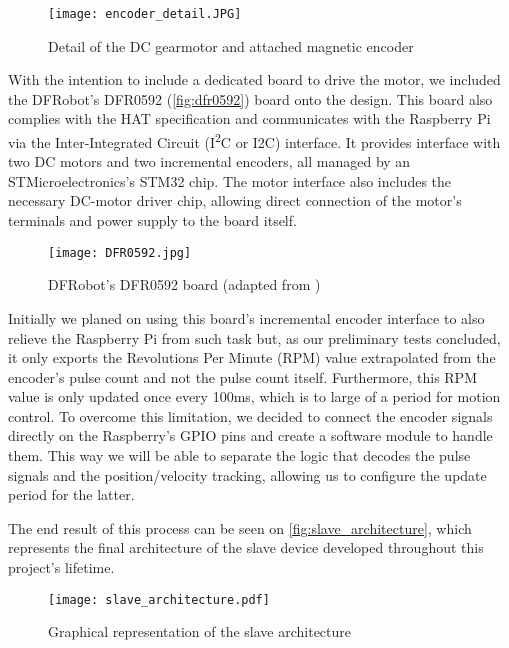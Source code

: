 \begin{figure}[htp]
	\centering
	\texttt{[image: encoder\_detail.JPG]}
	\caption{Detail of the DC gearmotor and attached magnetic encoder}
	\label{fig:encoder_detail}
\end{figure}

With the intention to include a dedicated board to drive the motor, we included the DFRobot's DFR0592 \cite{hdw:dfr0592} (\autoref{fig:dfr0592}) board onto the design.
This board also complies with the HAT specification and communicates with the Raspberry Pi via the Inter-Integrated Circuit (I\textsuperscript{2}C or I2C) interface.
It provides interface with two DC motors and two incremental encoders, all managed by an STMicroelectronics's STM32 chip.
The motor interface also includes the necessary DC-motor driver chip, allowing direct connection of the motor's terminals and power supply to the board itself.

\begin{figure}[htp]
	\centering
	\texttt{[image: DFR0592.jpg]}
	\caption{DFRobot's DFR0592 board (adapted from \cite{hdw:dfr0592})}
	\label{fig:dfr0592}
\end{figure}

Initially we planed on using this board's incremental encoder interface to also relieve the Raspberry Pi from such task but, as our preliminary tests concluded, it only exports the Revolutions Per Minute (RPM) value extrapolated from the encoder's pulse count and not the pulse count itself.
Furthermore, this RPM value is only updated once every 100ms, which is to large of a period for motion control.
To overcome this limitation, we decided to connect the encoder signals directly on the Raspberry's GPIO pins and create a software module to handle them.
This way we will be able to separate the logic that decodes the pulse signals and the position/velocity tracking, allowing us to configure the update period for the latter.

The end result of this process can be seen on \autoref{fig:slave_architecture}, which represents the final architecture of the slave device developed throughout this project's lifetime.

\begin{figure}[htp]
	\centering
	\texttt{[image: slave\_architecture.pdf]}
	\caption{Graphical representation of the slave architecture}
	\label{fig:slave_architecture}
\end{figure}
